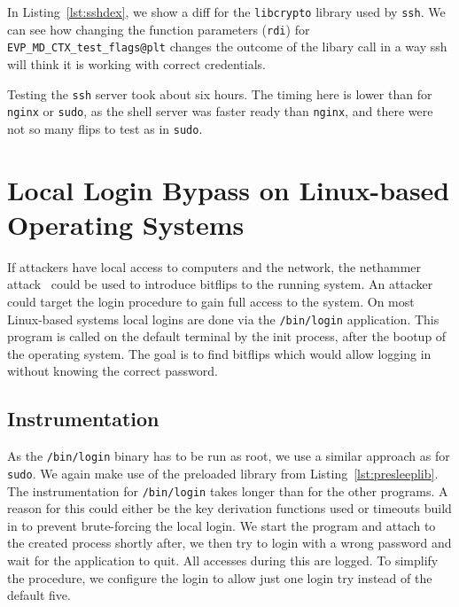 In Listing~\ref{lst:sshdex}, we show a diff for the \texttt{libcrypto} library
used by \texttt{ssh}. We can see how changing the function parameters
(\texttt{rdi}) for \texttt{EVP\_MD\_CTX\_test\_flags@plt} changes the outcome
of the libary call in a way ssh will think it is working with correct
credentials.

Testing the \texttt{ssh} server took about six hours. The timing here is lower
than for \texttt{nginx} or \texttt{sudo}, as the shell server was faster ready
than \texttt{nginx}, and there were not so many flips to test as in
\texttt{sudo}.

\section{Local Login Bypass on Linux-based Operating Systems}

If attackers have local access to computers and the network, the nethammer
attack~\cite{nethammer} could be used to introduce bitflips to the running
system. An attacker could target the login procedure to gain full access to the
system. On most Linux-based systems local logins are done via the
\texttt{/bin/login} application. This program is called on the default terminal
by the init process, after the bootup of the operating system. The goal is to
find bitflips which would allow logging in without knowing the correct password.

\subsection{Instrumentation}

As the \texttt{/bin/login} binary has to be run as root, we use a similar
approach as for \texttt{sudo}. We again make use of the preloaded library from
Listing~\ref{lst:presleeplib}. The instrumentation for \texttt{/bin/login} takes
longer than for the other programs. A reason for this could either be the key
derivation functions used or timeouts build in to prevent brute-forcing the
local login. We start the program and attach to the created process shortly
after, we then try to login with a wrong password and wait for the application
to quit. All accesses during this are logged. To simplify the procedure, we
configure the login to allow just one login try instead of the default five.

